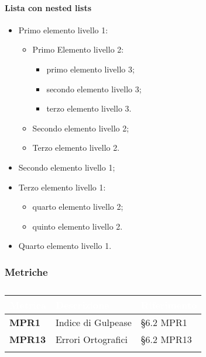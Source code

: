 		\paragraph*{Lista con nested lists}
		\begin{itemize}
			\item Primo elemento livello 1:
			\begin{itemize}
				\item Primo Elemento livello 2:
				\begin{itemize}
					\item primo elemento  livello 3;
					\item secondo elemento livello 3;
					\item terzo elemento livello 3.
				\end{itemize}
				\item Secondo elemento livello 2;
				\item Terzo elemento livello 2.
			\end{itemize}
			\item Secondo elemento livello 1;
			\item Terzo elemento livello 1:
			\begin{itemize}
				\item quarto elemento livello 2;
				\item quinto elemento livello 2.
			\end{itemize}
			\item Quarto elemento livello 1.
		\end{itemize}

			\subsubsection{Metriche}
			\setlength{\freewidth}{\dimexpr\textwidth-0\tabcolsep}
			\renewcommand{\arraystretch}{1.5}
			\setlength{\aboverulesep}{0pt}
			\setlength{\belowrulesep}{0pt}
			\begin{longtable}{L{.22\freewidth} L{.4\freewidth} L{.2\freewidth}}
				\toprule
				\textcolor{white}{\textbf{Metrica}}&
				\textcolor{white}{\textbf{Descrizione}}&	
				\textcolor{white}{\textbf{Riferimento}}\\
				\toprule
				\endhead
				
				\textbf{MPR1} & Indice di Gulpease & \S 6.2 MPR1 \\
				\textbf{MPR13} & Errori Ortografici & \S 6.2 MPR13 \\

				\bottomrule
				\caption{}
			\end{longtable}
			
